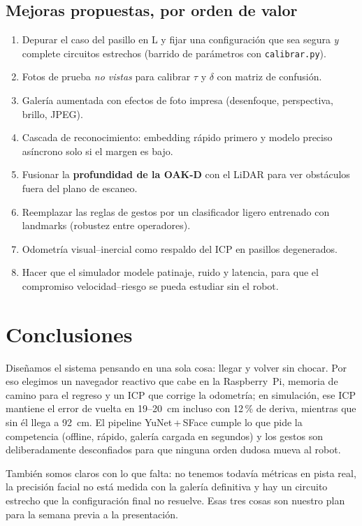 \documentclass[11pt,a4paper]{article}
\newcommand{\cmd}[1]{\texttt{\small #1}}
\begin{document}
\subsection{Mejoras propuestas, por orden de valor}
\begin{enumerate}
\item Depurar el caso del pasillo en L y fijar una configuraci\'on que sea segura \emph{y} complete circuitos estrechos (barrido de par\'ametros con \cmd{calibrar.py}).
\item Fotos de prueba \emph{no vistas} para calibrar $\tau$ y $\delta$ con matriz de confusi\'on.
\item Galer\'ia aumentada con efectos de foto impresa (desenfoque, perspectiva, brillo, JPEG).
\item Cascada de reconocimiento: embedding r\'apido primero y modelo preciso as\'incrono solo si el margen es bajo.
\item Fusionar la \textbf{profundidad de la OAK-D} con el LiDAR para ver obst\'aculos fuera del plano de escaneo.
\item Reemplazar las reglas de gestos por un clasificador ligero entrenado con landmarks (robustez entre operadores).
\item Odometr\'ia visual--inercial como respaldo del ICP en pasillos degenerados.
\item Hacer que el simulador modele patinaje, ruido y latencia, para que el compromiso velocidad--riesgo se pueda estudiar sin el robot.
\end{enumerate}

\section{Conclusiones}
Dise\~namos el sistema pensando en una sola cosa: llegar y volver sin chocar. Por eso elegimos un navegador reactivo que cabe en la Raspberry~Pi, memoria de camino para el regreso y un ICP que
corrige la odometr\'ia; en simulaci\'on, ese ICP mantiene el error de vuelta en 19--20~cm incluso con 12\,\% de deriva, mientras que sin \'el llega a 92~cm. El pipeline YuNet\,+\,SFace cumple lo que pide la competencia
(offline, r\'apido, galer\'ia cargada en segundos) y los gestos son deliberadamente desconfiados para que ninguna orden dudosa mueva al robot.

Tambi\'en somos claros con lo que falta: no tenemos todav\'ia m\'etricas en pista real, la precisi\'on facial no est\'a medida con la galer\'ia definitiva y hay un circuito estrecho que la configuraci\'on final no resuelve. Esas
tres cosas son nuestro plan para la semana previa a la presentaci\'on.
\end{document}
